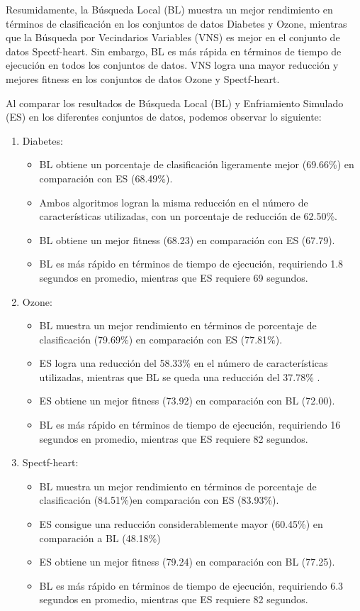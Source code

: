 Resumidamente, la Búsqueda Local (BL) muestra un mejor rendimiento en términos de clasificación en los conjuntos de datos Diabetes y Ozone, mientras que la Búsqueda por Vecindarios Variables (VNS) es mejor en el conjunto de datos Spectf-heart. Sin embargo, BL es más rápida en términos de tiempo de ejecución en todos los conjuntos de datos. VNS logra una mayor reducción y mejores fitness en los conjuntos de datos Ozone y Spectf-heart.


Al comparar los resultados de Búsqueda Local (BL) y Enfriamiento Simulado (ES) en los diferentes conjuntos de datos, podemos observar lo siguiente:

\begin{enumerate}
	\item Diabetes:
	\begin{itemize}
\item BL obtiene un porcentaje de clasificación ligeramente mejor (69.66\%) en comparación con ES (68.49\%).
\item  Ambos algoritmos logran la misma reducción en el número de características utilizadas, con un porcentaje de reducción de 62.50\%.
\item BL obtiene un mejor fitness (68.23) en comparación con ES (67.79).
\item BL es más rápido en términos de tiempo de ejecución, requiriendo 1.8 segundos en promedio, mientras que ES requiere 69 segundos.
	\end{itemize}

\item Ozone:
\begin{itemize}
\item BL muestra un mejor rendimiento en términos de porcentaje de clasificación (79.69\%) en comparación con ES (77.81\%).
\item ES logra una reducción del 58.33\% en el número de características utilizadas, mientras que BL se queda una reducción del 37.78\% .
\item ES obtiene un mejor fitness (73.92) en comparación con BL (72.00).
\item BL es más rápido en términos de tiempo de ejecución, requiriendo 16 segundos en promedio, mientras que ES requiere 82 segundos.
\end{itemize}

\item Spectf-heart:
\begin{itemize}
\item BL muestra un mejor rendimiento en términos de porcentaje de clasificación (84.51\%)en comparación con ES (83.93\%).
\item ES consigue una reducción considerablemente mayor (60.45\%) en comparación a BL (48.18\%)
\item ES obtiene un mejor fitness (79.24) en comparación con BL (77.25).
\item BL es más rápido en términos de tiempo de ejecución, requiriendo 6.3 segundos en promedio, mientras que ES requiere 82 segundos.
\end{itemize}


\end{enumerate}
